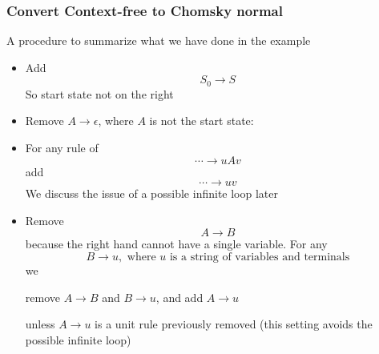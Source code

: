 




\begin{frame}[allowframebreaks] \frametitle{Convert Context-free to Chomsky normal}

  A procedure to summarize what we have done in the example
  
  \begin{itemize}
  \item Add
    \begin{equation*}
    S_0 \rightarrow S
  \end{equation*}
So start state not on the right
\item Remove $A \rightarrow \epsilon$, where $A$ is not the start state:
\item[] For any rule of
  \begin{equation*}
\cdots  \rightarrow uAv 
\end{equation*}
 add
 \begin{equation*}
\cdots \rightarrow uv
\end{equation*}
We discuss the issue of a possible infinite loop later
\item Remove
  \begin{equation*}
  A \rightarrow B
\end{equation*}
because the right hand cannot have a single variable.
For any
\begin{equation*}
  B \rightarrow u, \text{ where $u$ is a string of variables and terminals}
\end{equation*}
we
\begin{center}
remove $A \rightarrow B$ and   $B \rightarrow u$,
and add $A \rightarrow u$
\end{center}
unless $A \rightarrow u$ is a \alert{unit}
rule previously removed (this setting avoids the possible infinite loop)


\end{itemize}
\end{frame}
